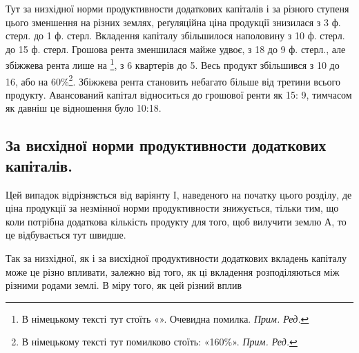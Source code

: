 Тут за низхідної норми продуктивности додаткових капіталів і за різного
ступеня цього зменшення на різних землях, реґуляційна ціна продукції знизилася
з 3 ф. стерл. до 1 ф. стерл. Вкладення капіталу збільшилося наполовину з 10 ф.
стерл. до 15 ф. стерл. Грошова рента зменшилася майже удвоє, з 18 до 9 ф.
стерл., але збіжжева рента лише на  \footnote*{
В німецькому тексті тут стоїть «». Очевидна помилка. \emph{Прим. Ред.}
}, з 6 квартерів до 5. Весь продукт
збільшився з 10 до 16, або на 60\%\footnote*{
В німецькому тексті тут помилково стоїть: «160\%». \emph{Прим. Ред.}
}. Збіжжева рента становить небагато більше
від третини всього продукту. Авансований капітал відноситься до грошової ренти
як 15: 9, тимчасом як давніш це відношення було 10:18.

\subsection{За висхідної норми продуктивности додаткових капіталів.}

Цей випадок відрізняється від варіянту І, наведеного на початку цього
розділу, де ціна продукції за незмінної норми продуктивности знижується, тільки
тим, що коли потрібна додаткова кількість продукту для того, щоб вилучити
землю А, то це відбувається тут швидше.

Так за низхідної, як і за висхідної продуктивности додаткових вкладень
капіталу може це різно впливати, залежно від того, як ці вкладення розподіляються
між різними родами землі. В міру того, як цей різний вплив
\parbreak{}  %
